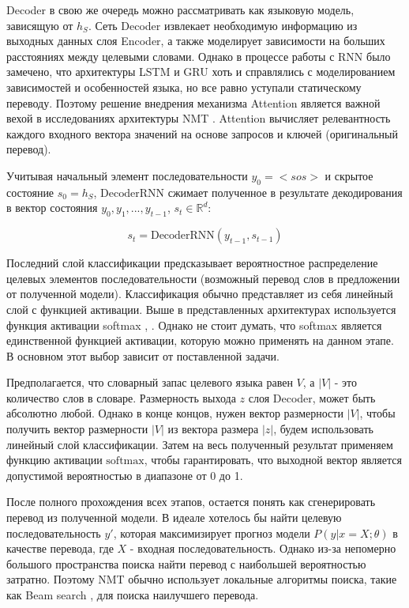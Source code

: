 \documentclass[a4paper,12pt]{article}
\begin{document}
	Decoder в свою же очередь можно рассматривать как языковую модель, зависящую от $h_S$. Сеть Decoder извлекает необходимую информацию из выходных данных слоя Encoder, а также моделирует зависимости на больших расстояниях между целевыми словами. Однако в процессе работы с RNN было замечено, что архитектуры LSTM и GRU хоть и справлялись с моделированием зависимостей и особенностей языка, но все равно уступали статическому переводу. Поэтому решение внедрения механизма Attention является важной вехой в исследованиях архитектуры NMT \cite{10}. Attention вычисляет релевантность каждого входного вектора значений на основе запросов и ключей (оригинальный перевод).
	
	Учитывая начальный элемент последовательности $y_0 = <sos>$ и скрытое состояние $s_0 = h_S$, $\text{DecoderRNN}$ сжимает полученное в результате декодирования в вектор состояния ${y_0, y_1, ... ,y_{t-1}}$, $s_t \in \mathbb{R}^d$:
	
	$$
	    s_t = \text{DecoderRNN}(y_{t-1}, s_{t-1})
	$$
	
	Последний слой классификации предсказывает вероятностное распределение целевых элементов последовательности (возможный перевод слов в предложении от полученной модели). Классификация обычно представляет из себя линейный слой с функцией активации. Выше в представленных архитектурах используется функция активации softmax \cite{2}, \cite{3}. Однако не стоит думать, что softmax является единственной функцией активации, которую можно применять на данном этапе. В основном этот выбор зависит от поставленной задачи. 
	
	Предполагается, что словарный запас целевого языка равен $V$, а $|V|$ - это количество слов в словаре. Размерность выхода $z$ слоя Decoder, может быть абсолютно любой. Однако в конце концов, нужен вектор размерности $|V|$, чтобы получить вектор размерности $|V|$ из вектора размера $|z|$, будем использовать линейный слой классификации. Затем на весь полученный результат применяем функцию активации $\text{softmax}$, чтобы гарантировать, что выходной вектор является допустимой вероятностью в диапазоне от 0 до 1.
	
	После полного прохождения всех этапов, остается понять как сгенерировать перевод из полученной модели. В идеале хотелось бы найти целевую последовательность $y'$, которая максимизирует прогноз модели $P(y|x=X;\theta)$ в качестве перевода, где $X$ - входная последовательность. Однако из-за непомерно большого пространства поиска найти перевод с наибольшей вероятностью затратно. Поэтому NMT обычно использует локальные алгоритмы поиска, такие как Beam search \cite{8}, для поиска наилучшего перевода.
	
\end{document}
